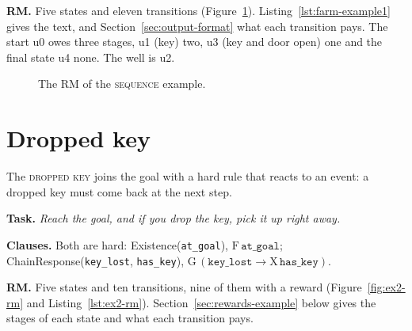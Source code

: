 \documentclass[11pt,english,listoffigures,listoftables]{tfgetsinf}
\newcommand{\runex}[1]{\textsc{#1}}  %
\begin{document}
\textbf{RM.} Five states and eleven transitions (Figure~\ref{fig:ex1-rm}). Listing~\ref{lst:farm-example1} gives the text, and Section~\ref{sec:output-format} what each transition pays. The start u0 owes three stages, u1 (key) two, u3 (key and door open) one and the final state u4 none. The well is u2.

\begin{figure}[H]
\centering
{}
\caption[RM of the \runex{sequence}]{The RM of the \runex{sequence} example.}
\label{fig:ex1-rm}
\end{figure}

\section{Dropped key}
\label{app:ex2}
The \runex{dropped key} joins the goal with a hard rule that reacts to an event: a dropped key must come back at the next step.

\textbf{Task.} \textit{Reach the goal, and if you drop the key, pick it up right away.}

\textbf{Clauses.} Both are hard: Existence(\texttt{at\_goal}), $\mathrm{F}\,\texttt{at\_goal}$; ChainResponse(\texttt{key\_lost}, \texttt{has\_key}), $\mathrm{G}\,(\texttt{key\_lost} \rightarrow \mathrm{X}\,\texttt{has\_key})$.

\textbf{RM.} Five states and ten transitions, nine of them with a reward (Figure~\ref{fig:ex2-rm} and Listing~\ref{lst:ex2-rm}). Section~\ref{sec:rewards-example} below gives the stages of each state and what each transition pays.
\end{document}
